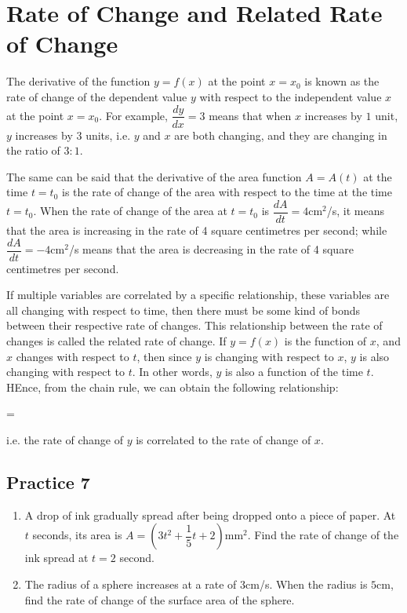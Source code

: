 \documentclass{report}
\begin{document}
\section{Rate of Change and Related Rate of Change}

The derivative of the function $y = f(x)$ at the point $x = x_0$ is known as
the rate of change of the dependent value $y$ with respect to the independent
value $x$ at the point $x = x_0$. For example, $\dfrac{d y}{d x} = 3$ means
that when $x$ increases by $1$ unit, $y$ increases by $3$ units, i.e. $y$ and
$x$ are both changing, and they are changing in the ratio of $3:1$.

The same can be said that the derivative of the area function $A = A(t)$ at the
time $t = t_0$ is the rate of change of the area with respect to the time at
the time $t = t_0$. When the rate of change of the area at $t = t_0$ is
$\dfrac{d A}{d t} = 4$cm$^2$/s, it means that the area is increasing in the
rate of 4 square centimetres per second; while $\dfrac{d A}{d t} = -4$cm$^2$/s
means that the area is decreasing in the rate of 4 square centimetres per
second.

If multiple variables are correlated by a specific relationship, these
variables are all changing with respect to time, then there must be some kind
of bonds between their respective rate of changes. This relationship between
the rate of changes is called the related rate of change. If $y = f(x)$ is the
function of $x$, and $x$ changes with respect to $t$, then since $y$ is
changing with respect to $x$, $y$ is also changing with respect to $t$. In
other words, $y$ is also a function of the time $t$. HEnce, from the chain
rule, we can obtain the following relationship:
\begin{cequation}
     =  \cdot {}
\end{cequation}
i.e. the rate of change of $y$ is correlated to the rate of change of $x$.

\subsection{Practice 7}
\begin{enumerate}
    \item A drop of ink gradually spread after being dropped onto a piece of paper. At
          $t$ seconds, its area is $A = \left(3t^2 + \dfrac{1}{5}t + 2\right)$mm$^2$.
          Find the rate of change of the ink spread at $t = 2$ second.
    \item The radius of a sphere increases at a rate of $3$cm/s. When the radius is
          $5$cm, find the rate of change of the surface area of the sphere.
\end{enumerate}
\end{document}
